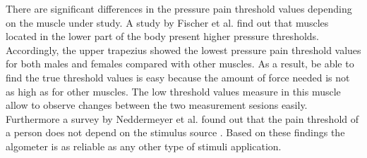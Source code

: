 There are significant differences in the pressure pain threshold values depending on the  muscle under study. A study by Fischer et al. \cite{Fischer1987} find out that muscles located in the lower part of the body present  higher pressure thresholds. Accordingly, the upper trapezius showed the lowest pressure pain threshold values for both males and females compared with other muscles. As a result, be able to find the true threshold values is easy because the amount of force needed is not as high as for other muscles. The low threshold values measure in this muscle allow to observe changes between the two measurement sesions easily.
Furthermore a survey by Neddermeyer et al. \cite{Neddermeyer2007} found out that the pain threshold of a person does not depend on the stimulus source . Based on these findings the algometer is as reliable as any other type of stimuli application.


